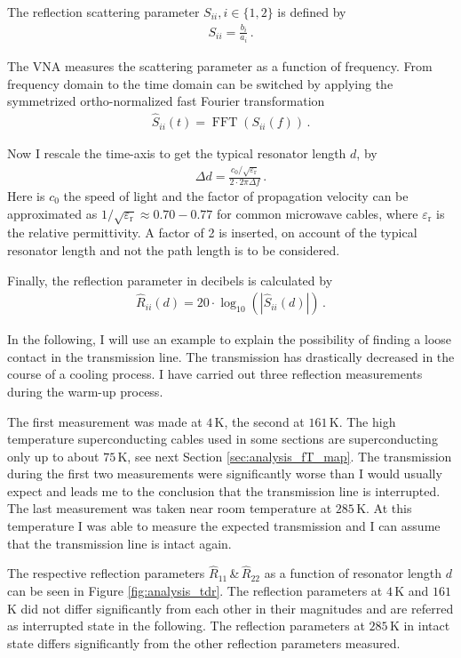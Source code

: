 The reflection scattering parameter $S_{ii}, i\in\{1,2\}$ is defined by
\begin{align}
    S_{ii}=\frac{b_i}{a_i}\,.
\end{align}

The VNA measures the scattering parameter as a function of frequency. From frequency domain to the time domain can be switched by applying the symmetrized ortho-normalized fast Fourier transformation
\begin{align}
    \hat{S}_{ii}(t)=\operatorname{FFT}\left( S_{ii}(f)\right)\,.
\end{align}

Now I rescale the time-axis to get the typical resonator length $d$, by
\begin{align}
    \Delta d = \frac{c_0/\sqrt{\varepsilon_\text{r}}}{2\cdot 2\pi\Delta f}\,.
\end{align}
Here is $c_0$ the speed of light and the factor of propagation velocity can be approximated as $1/\sqrt{\varepsilon_\text{r}}\approx 0.70-0.77$ for common microwave cables, where $\varepsilon_\text{r}$ is the relative permittivity. A factor of 2 is inserted, on account of the typical resonator length and not the path length is to be considered. \cite{HS2020, elspec}

Finally, the reflection parameter in decibels is calculated by
\begin{align}
    \hat{R}_{ii}(d)=20\cdot \log_{10}\left(|\hat{S}_{ii}(d)|\right)\,.
\end{align}

In the following, I will use an example to explain the possibility of finding a loose contact in the transmission line. The transmission has drastically decreased in the course of a cooling process. I have carried out three reflection measurements during the warm-up process. 

The first measurement was made at $4\,$K, the second at $161\,$K. The high temperature superconducting cables used in some sections are superconducting only up to about $75\,$K, see next Section \ref{sec:analysis_fT_map}. The transmission during the first two measurements were significantly worse than I would usually expect and leads me to the conclusion that the transmission line is interrupted. The last measurement was taken near room temperature at $285\,$K. At this temperature I was able to measure the expected transmission and I can assume that the transmission line is intact again.

The respective reflection parameters $\hat{R}_{11}$\,\&\,$\hat{R}_{22}$ as a function of resonator length $d$ can be seen in Figure \ref{fig:analysis_tdr}. The reflection parameters at $4\,$K and $161\,$K did not differ significantly from each other in their magnitudes and are referred as interrupted state in the following. The reflection parameters at $285\,$K in intact state differs significantly from the other reflection parameters measured.

